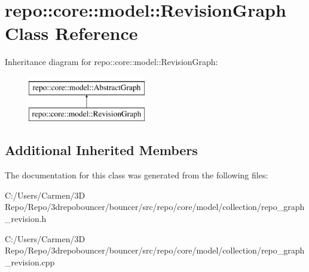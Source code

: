 \hypertarget{classrepo_1_1core_1_1model_1_1_revision_graph}{}\section{repo\+:\+:core\+:\+:model\+:\+:Revision\+Graph Class Reference}
\label{classrepo_1_1core_1_1model_1_1_revision_graph}
Inheritance diagram for repo\+:\+:core\+:\+:model\+:\+:Revision\+Graph\+:\begin{figure}[H]
\begin{center}
\leavevmode
\includegraphics[height=2.000000cm]{classrepo_1_1core_1_1model_1_1_revision_graph}
\end{center}
\end{figure}
\subsection*{Additional Inherited Members}


The documentation for this class was generated from the following files\+:\begin{DoxyCompactItemize}
\item 
C\+:/\+Users/\+Carmen/3\+D Repo/\+Repo/3drepobouncer/bouncer/src/repo/core/model/collection/repo\+\_\+graph\+\_\+revision.\+h\item 
C\+:/\+Users/\+Carmen/3\+D Repo/\+Repo/3drepobouncer/bouncer/src/repo/core/model/collection/repo\+\_\+graph\+\_\+revision.\+cpp\end{DoxyCompactItemize}
